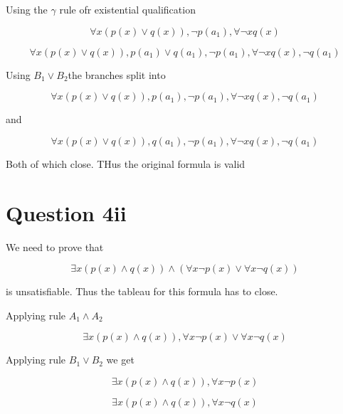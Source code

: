 \documentclass[10pt,a4paper]{article}
\begin{document}
Using the $\gamma$ rule ofr existential qualification

\begin{equation}
 \forall x(p(x)\vee q(x)),\neg p(a_1),\forall\neg xq(x)
\end{equation}

\begin{equation}
 \forall x(p(x)\vee q(x)),p(a_1)\vee q(a_1),\neg p(a_1),\forall\neg xq(x),\neg q(a_1)
 \end{equation}
 
 Using $B_1\vee B_2$the branches split into
 
 \begin{equation}
 \forall x(p(x)\vee q(x)),p(a_1),\neg p(a_1),\forall\neg xq(x),\neg q(a_1)
 \end{equation}
 
 and
 
 \begin{equation}
 \forall x(p(x)\vee q(x)), q(a_1),\neg p(a_1),\forall\neg xq(x),\neg q(a_1)
 \end{equation}
 
 Both of which close. THus the original formula is valid

 
 
 \section{Question 4ii}
 
 
 We need to prove that
 
 \begin{equation}
  \exists x(p(x)\wedge q(x))\wedge(\forall x\neg p(x) \vee \forall x \neg q(x))
 \end{equation}

 is unsatisfiable. Thus the tableau for this formula has to close.
 
 Applying rule $A_1\wedge A_2$
 
 \begin{equation}
  \exists x(p(x)\wedge q(x)),\forall x\neg p(x) \vee \forall x \neg q(x)
 \end{equation}
 
 Applying rule $B_1 \vee B_2$ we get 
 
 \begin{equation}
 \label{421}
 \exists x(p(x)\wedge q(x)),\forall x \neg p(x)
 \end{equation}

 \begin{equation}
 \label{422}
  \exists x(p(x)\wedge q(x)),\forall x \neg q(x)
 \end{equation}
 
\end{document}
